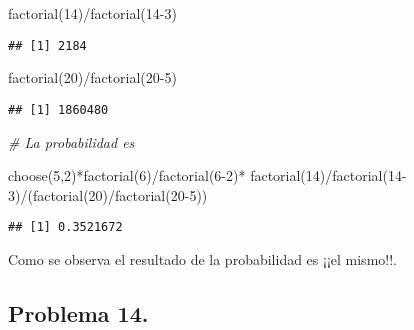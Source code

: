 \documentclass[
]{article}
\newenvironment{Shaded}{\begin{snugshade}}{\end{snugshade}}
\newcommand{\CommentTok}[1]{\textcolor[rgb]{0.56,0.35,0.01}{\textit{#1}}}
\newcommand{\DecValTok}[1]{\textcolor[rgb]{0.00,0.00,0.81}{#1}}
\newcommand{\FunctionTok}[1]{\textcolor[rgb]{0.00,0.00,0.00}{#1}}
\newcommand{\NormalTok}[1]{#1}
\newcommand{\SpecialCharTok}[1]{\textcolor[rgb]{0.00,0.00,0.00}{#1}}
\begin{document}
\begin{Shaded}
\begin{Highlighting}[]
\FunctionTok{factorial}\NormalTok{(}\DecValTok{14}\NormalTok{)}\SpecialCharTok{/}\FunctionTok{factorial}\NormalTok{(}\DecValTok{14{-}3}\NormalTok{)}
\end{Highlighting}
\end{Shaded}

\begin{verbatim}
## [1] 2184
\end{verbatim}

\begin{Shaded}
\begin{Highlighting}[]
\FunctionTok{factorial}\NormalTok{(}\DecValTok{20}\NormalTok{)}\SpecialCharTok{/}\FunctionTok{factorial}\NormalTok{(}\DecValTok{20{-}5}\NormalTok{)}
\end{Highlighting}
\end{Shaded}

\begin{verbatim}
## [1] 1860480
\end{verbatim}

\begin{Shaded}
\begin{Highlighting}[]
\CommentTok{\# La probabilidad es }

\FunctionTok{choose}\NormalTok{(}\DecValTok{5}\NormalTok{,}\DecValTok{2}\NormalTok{)}\SpecialCharTok{*}\FunctionTok{factorial}\NormalTok{(}\DecValTok{6}\NormalTok{)}\SpecialCharTok{/}\FunctionTok{factorial}\NormalTok{(}\DecValTok{6{-}2}\NormalTok{)}\SpecialCharTok{*}
  \FunctionTok{factorial}\NormalTok{(}\DecValTok{14}\NormalTok{)}\SpecialCharTok{/}\FunctionTok{factorial}\NormalTok{(}\DecValTok{14{-}3}\NormalTok{)}\SpecialCharTok{/}\NormalTok{(}\FunctionTok{factorial}\NormalTok{(}\DecValTok{20}\NormalTok{)}\SpecialCharTok{/}\FunctionTok{factorial}\NormalTok{(}\DecValTok{20{-}5}\NormalTok{))}
\end{Highlighting}
\end{Shaded}

\begin{verbatim}
## [1] 0.3521672
\end{verbatim}

Como se observa el resultado de la probabilidad es ¡¡el mismo!!.

\hypertarget{problema-14.}{%
\subsection{Problema 14.}\label{problema-14.}}
\end{document}
